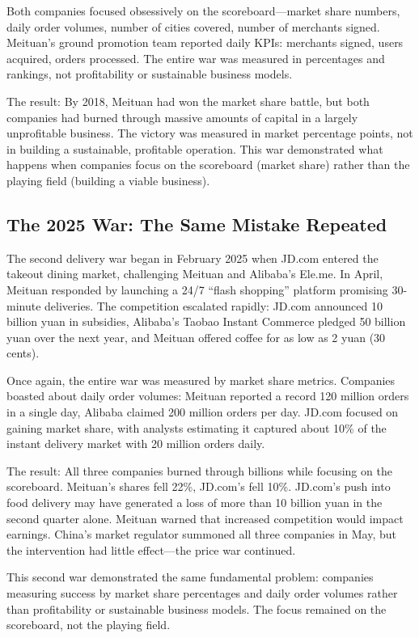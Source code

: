 Both companies focused obsessively on the scoreboard—market share numbers, daily order volumes, number of cities covered, number of merchants signed. Meituan's ground promotion team reported daily KPIs: merchants signed, users acquired, orders processed. The entire war was measured in percentages and rankings, not profitability or sustainable business models.

The result: By 2018, Meituan had won the market share battle, but both companies had burned through massive amounts of capital in a largely unprofitable business. The victory was measured in market percentage points, not in building a sustainable, profitable operation. This war demonstrated what happens when companies focus on the scoreboard (market share) rather than the playing field (building a viable business).


\subsection*{The 2025 War: The Same Mistake Repeated}

The second delivery war began in February 2025 when JD.com entered the takeout dining market, challenging Meituan and Alibaba's Ele.me. In April, Meituan responded by launching a 24/7 ``flash shopping'' platform promising 30-minute deliveries. The competition escalated rapidly: JD.com announced 10 billion yuan in subsidies, Alibaba's Taobao Instant Commerce pledged 50 billion yuan over the next year, and Meituan offered coffee for as low as 2 yuan (30 cents).

Once again, the entire war was measured by market share metrics. Companies boasted about daily order volumes: Meituan reported a record 120 million orders in a single day, Alibaba claimed 200 million orders per day. JD.com focused on gaining market share, with analysts estimating it captured about 10\% of the instant delivery market with 20 million orders daily.

The result: All three companies burned through billions while focusing on the scoreboard. Meituan's shares fell 22\%, JD.com's fell 10\%. JD.com's push into food delivery may have generated a loss of more than 10 billion yuan in the second quarter alone. Meituan warned that increased competition would impact earnings. China's market regulator summoned all three companies in May, but the intervention had little effect—the price war continued.

This second war demonstrated the same fundamental problem: companies measuring success by market share percentages and daily order volumes rather than profitability or sustainable business models. The focus remained on the scoreboard, not the playing field.

